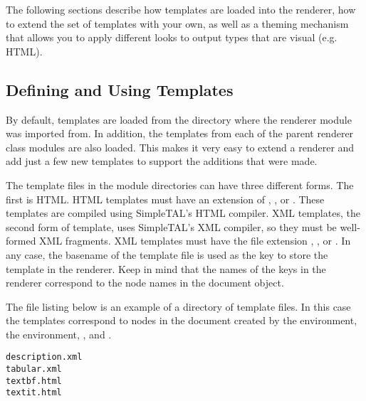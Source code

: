 The following sections describe how templates are loaded into the 
renderer, how to extend the set of templates with your own, as well
as a theming mechanism that allows you to apply different looks to 
output types that are visual (e.g. HTML).

\subsection{Defining and Using Templates}


By default, templates are loaded from the directory where the 
renderer module was imported from.  In addition, the templates from
each of the parent renderer class modules are also loaded.  This makes
it very easy to extend a renderer and add just a few new templates
to support the additions that were made.

The template files in the module directories can have three different forms.
The first is HTML.  HTML templates must have an extension of ,
 , or .  These templates are compiled using 
SimpleTAL's HTML compiler.  XML templates, the second form of template, 
uses SimpleTAL's XML compiler, so they must be well-formed XML 
fragments.  XML templates must have the file extension , 
, or .  In any case, the basename of the template
file is used as the key to store the template in the renderer.  Keep in
mind that the names of the keys in the renderer correspond to the node
names in the document object.  

The file listing below is an example of a directory of template files.
In this case the templates correspond to nodes in the document created
by the  environment, the 
environment, , and .
\begin{verbatim}
description.xml
tabular.xml
textbf.html
textit.html
\end{verbatim}

